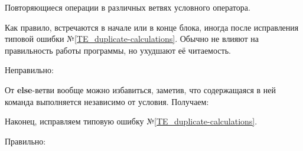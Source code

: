 \begin{typerror}
	\label{TE_duplicate-operations-if-else}
	Повторяющиеся операции в различных ветвях условного оператора.

	Как правило, встречаются в начале или в конце блока, иногда после исправления типовой ошибки №\ref{TE_duplicate-calculations}.
	Обычно не влияют на правильность работы программы, но ухудшают её читаемость.


	Неправильно:

	От \textbf{else}-ветви вообще можно избавиться, заметив, что содержащаяся в ней команда выполняется независимо от условия.
	Получаем:


	Наконец, исправляем типовую ошибку №\ref{TE_duplicate-calculations}.

	Правильно:

\end{typerror}
